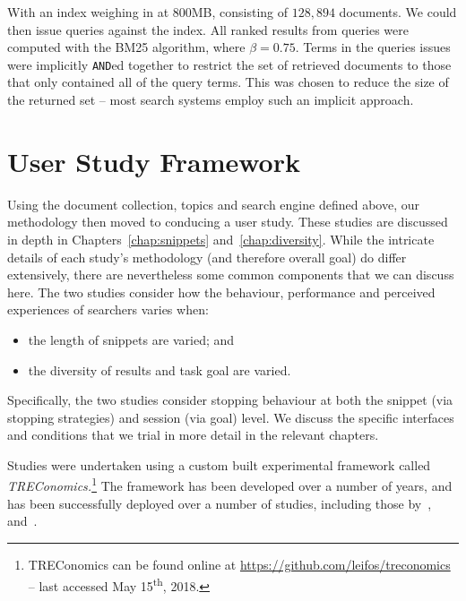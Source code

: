 With an index weighing in at 800MB, consisting of $128,894$ documents.  We could then issue queries against the index. All ranked results from queries were computed with the BM25 algorithm, where $\beta=0.75$. Terms in the queries issues were implicitly \texttt{AND}ed together to restrict the set of retrieved documents to those that only contained all of the query terms. This was chosen to reduce the size of the returned set -- most search systems employ such an implicit approach.

\section{User Study Framework}\label{sec:method:user_study}
Using the document collection, topics and search engine defined above, our methodology then moved to conducing a user study. These studies are discussed in depth in Chapters~\ref{chap:snippets} and~\ref{chap:diversity}. While the intricate details of each study's methodology (and therefore overall goal) do differ extensively, there are nevertheless some common components that we can discuss here. The two studies consider how the behaviour, performance and perceived experiences of searchers varies when:


\begin{itemize}
    \item{the length of snippets are varied; and}
    \item{the diversity of results and task goal are varied.}
\end{itemize}

Specifically, the two studies consider stopping behaviour at both the snippet (via stopping strategies) and session (via goal) level. We discuss the specific interfaces and conditions that we trial in more detail in the relevant chapters.

Studies were undertaken using a custom built experimental framework called \emph{TREConomics.}\footnote{TREConomics can be found online at \url{https://github.com/leifos/treconomics} -- last accessed May 15\textsuperscript{th}, 2018.} The framework has been developed over a number of years, and has been successfully deployed over a number of studies, including those by~\cite{azzopardi2013query_cost},~\cite{maxwell2014temporal_delays} and~\cite{kelly2015serp_size}.

